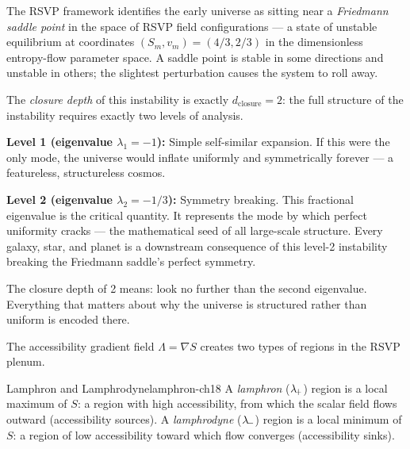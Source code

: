 \begin{tcolorbox}[enhanced, breakable,
  colback=RSVPgray, colframe=RSVPdeep, arc=4pt, boxrule=0.6pt,
  title={\bfseries\sffamily Technical Note: The Friedmann Saddle and Closure Depth},
  coltitle=white, attach boxed title to top left={yshift=-2mm,xshift=6mm},
  boxed title style={colback=RSVPdeep,sharp corners},
  top=4mm,left=4mm,right=4mm,bottom=4mm]

The RSVP framework identifies the early universe as sitting near a
\emph{Friedmann saddle point} in the space of RSVP field configurations —
a state of unstable equilibrium at coordinates $(S_m, v_m) = (4/3, 2/3)$
in the dimensionless entropy-flow parameter space. A saddle point is
stable in some directions and unstable in others; the slightest
perturbation causes the system to roll away.

The \emph{closure depth} of this instability is exactly $d_\text{closure} = 2$:
the full structure of the instability requires exactly two levels of analysis.

\textbf{Level 1 (eigenvalue $\lambda_1 = -1$):} Simple self-similar expansion.
If this were the only mode, the universe would inflate uniformly and
symmetrically forever — a featureless, structureless cosmos.

\textbf{Level 2 (eigenvalue $\lambda_2 = -1/3$):} Symmetry breaking.
This fractional eigenvalue is the critical quantity. It represents the
mode by which perfect uniformity cracks — the mathematical seed of all
large-scale structure. Every galaxy, star, and planet is a downstream
consequence of this level-2 instability breaking the Friedmann saddle's
perfect symmetry.

The closure depth of 2 means: look no further than the second eigenvalue.
Everything that matters about why the universe is structured rather than
uniform is encoded there.
\end{tcolorbox}


The accessibility gradient field $\Lambda = \nabla S$ creates two types
of regions in the RSVP plenum.

\begin{definition}{Lamphron and Lamphrodyne}{lamphron-ch18}
  A \emph{lamphron} ($\lambda_{\!+}$) region is a local maximum of $S$:
  a region with high accessibility, from which the scalar field flows
  outward (accessibility sources). A \emph{lamphrodyne} ($\lambda_{\!-}$)
  region is a local minimum of $S$: a region of low accessibility
  toward which flow converges (accessibility sinks).
\end{definition}

